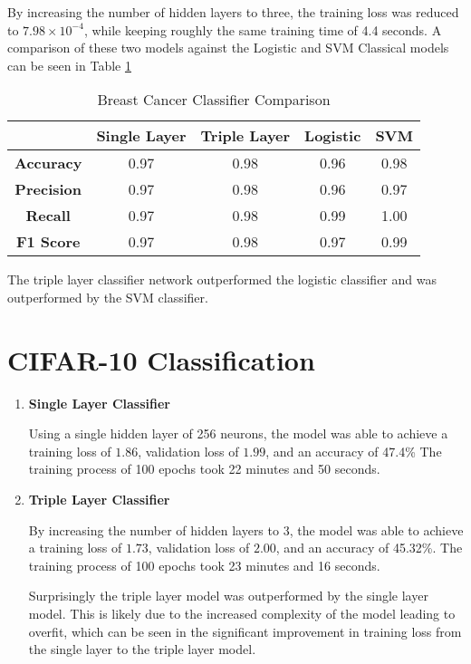 \documentclass{article}
\begin{document}
    By increasing the number of hidden layers to three, the training loss was reduced to $7.98 \times 10^{-4}$, while keeping roughly the same training time of 4.4 seconds. A comparison of these two models against the Logistic and SVM Classical models can be seen in Table \ref{tab:P2}

    \begin{table}[htbp] 
        \centering
        \begin{tabular}{|c|c|c|c|c|}
            \hline
            & \textbf{Single Layer} & \textbf{Triple Layer} & \textbf{Logistic} & \textbf{SVM} \\
            \hline
            \textbf{Accuracy} & 0.97 & 0.98 & 0.96 & 0.98 \\
            \hline
            \textbf{Precision} & 0.97 & 0.98 & 0.96 & 0.97 \\
            \hline
            \textbf{Recall} & 0.97 & 0.98 & 0.99 & 1.00 \\
            \hline
            \textbf{F1 Score} & 0.97 & 0.98 & 0.97 & 0.99 \\
            \hline
        \end{tabular}
        \caption{Breast Cancer Classifier Comparison}
        \label{tab:P2}
    \end{table}
    The triple layer classifier network outperformed the logistic classifier and was outperformed by the SVM classifier.

\section{CIFAR-10 Classification}
\begin{enumerate}[label=\alph*. ]
    \item{\textbf{Single Layer Classifier}}
    
    Using a single hidden layer of 256 neurons, the model was able to achieve a training loss of $1.86$, validation loss of $1.99$, and an accuracy of 47.4\% The training process of 100 epochs took 22 minutes and 50 seconds.

    \item{\textbf{Triple Layer Classifier}}
    
    By increasing the number of hidden layers to 3, the model was able to achieve a training loss of $1.73$, validation loss of $2.00$, and an accuracy of 45.32\%. The training process of 100 epochs took 23 minutes and 16 seconds.
    
    Surprisingly the triple layer model was outperformed by the single layer model. This is likely due to the increased complexity of the model leading to overfit, which can be seen in the significant improvement in training loss from the single layer to the triple layer model.
\end{enumerate}
\end{document}
